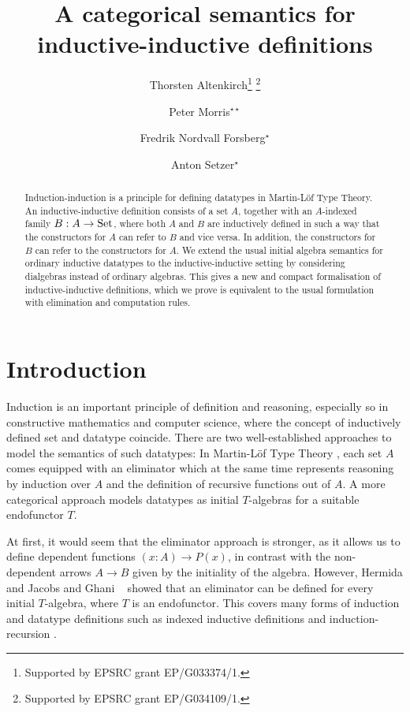 \documentclass[orivec,envcountsame, ,envcountsect]{llncs}
\title{A categorical semantics for inductive-inductive definitions}
\author{ Thorsten Altenkirch\inst{1}\thanks{Supported by EPSRC grant EP/G033374/1.}\fnmsep
                                    \thanks{Supported by EPSRC grant EP/G034109/1.}
\and Peter Morris\inst{1}$^{\star\star}$ %
\and Fredrik Nordvall Forsberg\inst{2}$^{\star}$
\and Anton Setzer\inst{2}$^{\star}$}
\institute{School of Computer Science, University of Nottingham
      \and Department of Computer Science, Swansea University}
\begin{document}
\maketitle

\begin{abstract}
  Induction-induction is a principle for defining datatypes in
  Martin-L\"of Type Theory. An inductive-inductive definition consists
  of a set $A$, together with an $A$-indexed family $B : A \to \text{Set}$,
  where both $A$ and $B$ are inductively defined in such a way that
  the constructors for $A$ can refer to $B$ and vice versa. In
  addition, the constructors for $B$ can refer to the constructors for
  $A$.
%
  We extend the usual initial algebra semantics for ordinary
  inductive datatypes to the inductive-inductive setting by
  considering dialgebras instead of ordinary algebras. This gives a
  new and compact formalisation of inductive-inductive definitions,
  which we prove is equivalent to the usual formulation with
  elimination and computation rules.
\end{abstract}

\section{Introduction}

Induction is an important principle of definition and reasoning,
especially so in constructive mathematics and computer science, where
the concept of inductively defined set and datatype coincide. There
are two well-established approaches to model the semantics of such
datatypes: In Martin-L\"of Type Theory
\cite{martinlof1984bibliopolis}, each set $A$ comes equipped with an
eliminator which at the same time represents reasoning by induction
over $A$ and the definition of recursive functions out of $A$.  A more
categorical approach %
models datatypes as initial $T$-algebras for a suitable endofunctor
$T$.

At first, it would seem that the eliminator approach is stronger, as
it allows us to define dependent functions $(x : A) \to P(x)$, in
contrast with the non-dependent arrows $A \to B$ given by the
initiality of the algebra. However, Hermida and Jacobs
\cite{hermidaJacobs1998initInduction} and Ghani \etal\
\cite{ghaniJohannFumex2010fibind} %
showed that an eliminator can be defined for every initial
$T$-algebra, where $T$ is an endofunctor.
This covers many forms of
induction and datatype definitions such as indexed inductive
definitions \cite{dybjer1994indfam} and induction-recursion
\cite{dybjersetzer1999finax}.
\end{document}
